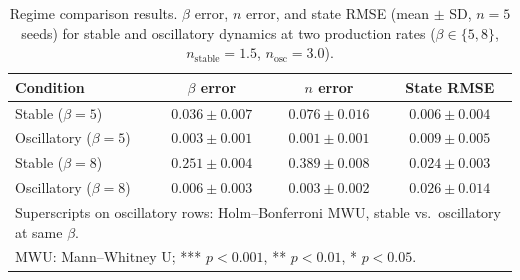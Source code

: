 \begin{table}[htbp]
\centering
\caption{Regime comparison results. $\beta$ error, $n$ error, and state RMSE (mean $\pm$ SD, $n = 5$ seeds) for stable and oscillatory dynamics at two production rates ($\beta \in \{5, 8\}$, $n_{\text{stable}}=1.5$, $n_{\text{osc}}=3.0$).}
\label{tab:exp5_regime_comparison}
{\small\setlength{\tabcolsep}{5pt}%
\begin{tabular*}{\textwidth}{@{\extracolsep{\fill}}lccc}
\toprule
Condition & $\beta$ error & $n$ error & State RMSE \\
\midrule
Stable ($\beta=5$) & $0.036 \pm 0.007$ & $0.076 \pm 0.016$ & $0.006 \pm 0.004$ \\
Oscillatory ($\beta=5$) & $0.003 \pm 0.001$\rlap{\textsuperscript{*}} & $0.001 \pm 0.001$\rlap{\textsuperscript{*}} & $0.009 \pm 0.005$ \\
\midrule
Stable ($\beta=8$) & $0.251 \pm 0.004$ & $0.389 \pm 0.008$ & $0.024 \pm 0.003$ \\
Oscillatory ($\beta=8$) & $0.006 \pm 0.003$\rlap{\textsuperscript{*}} & $0.003 \pm 0.002$\rlap{\textsuperscript{*}} & $0.026 \pm 0.014$ \\
\bottomrule
\multicolumn{4}{l}{\footnotesize Superscripts on oscillatory rows: Holm--Bonferroni MWU, stable vs.\ oscillatory at same $\beta$.} \\
\multicolumn{4}{l}{\footnotesize MWU: Mann--Whitney U; *** $p < 0.001$, ** $p < 0.01$, * $p < 0.05$.} \\
\end{tabular*}}
\end{table}

